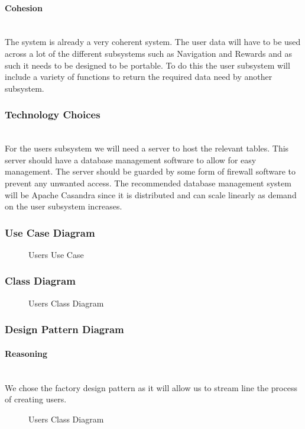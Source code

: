 \paragraph{Cohesion}
\mbox{}\\
The system is already a very coherent system. The user data will have to be used across a lot of the different subsystems such as Navigation and Rewards and as such it needs to be designed to be portable. To do this the user subsystem will include a variety of functions to return the required data need by another subsystem. 

\subsubsection{Technology Choices}
\mbox{}\\
For the users subsystem we will need a server to host the relevant tables. This server should have a database management software to allow for easy management. The server should be 
guarded by some form of firewall software to prevent any unwanted access. The recommended database management system will be Apache Casandra since it is distributed and can scale linearly as demand on the user subsystem increases.

\subsubsection{Use Case Diagram}
	\begin{figure}[h!]
	\caption{Users Use Case}
	\end{figure}
	
\subsubsection{Class Diagram}
	\begin{figure}[h!]
	\caption{Users Class Diagram}
	\end{figure}

\subsubsection{Design Pattern Diagram}
	\paragraph{Reasoning}
	\mbox{}\\
	We chose the factory design pattern as it will allow us to stream line the process of creating users. 
	\begin{figure}[h!]
	\caption{Users Class Diagram}
	\end{figure}
